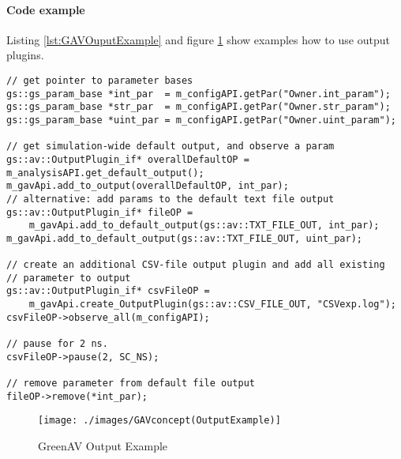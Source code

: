 \noindent
\begin{minipage}{\textwidth}
\paragraph{Code example}
Listing \ref{lst:GAVOuputExample} and figure \ref{fig:GAVOutputExample} show examples how to use output plugins.

\begin{lstlisting}[caption={Output plugin code example}, label=lst:GAVOuputExample]
// get pointer to parameter bases
gs::gs_param_base *int_par  = m_configAPI.getPar("Owner.int_param");
gs::gs_param_base *str_par  = m_configAPI.getPar("Owner.str_param");
gs::gs_param_base *uint_par = m_configAPI.getPar("Owner.uint_param");

// get simulation-wide default output, and observe a param
gs::av::OutputPlugin_if* overallDefaultOP = m_analysisAPI.get_default_output();
m_gavApi.add_to_output(overallDefaultOP, int_par);
// alternative: add params to the default text file output  
gs::av::OutputPlugin_if* fileOP =
    m_gavApi.add_to_default_output(gs::av::TXT_FILE_OUT, int_par);
m_gavApi.add_to_default_output(gs::av::TXT_FILE_OUT, uint_par);

// create an additional CSV-file output plugin and add all existing
// parameter to output
gs::av::OutputPlugin_if* csvFileOP = 
    m_gavApi.create_OutputPlugin(gs::av::CSV_FILE_OUT, "CSVexp.log");
csvFileOP->observe_all(m_configAPI);

// pause for 2 ns.
csvFileOP->pause(2, SC_NS);

// remove parameter from default file output
fileOP->remove(*int_par);
\end{lstlisting}
\end{minipage}

\begin{figure}[ht]
	\centerline{
		\texttt{[image: ./images/GAVconcept(OutputExample)]}}
	\caption{GreenAV Output Example}
	\label{fig:GAVOutputExample}
\end{figure}




